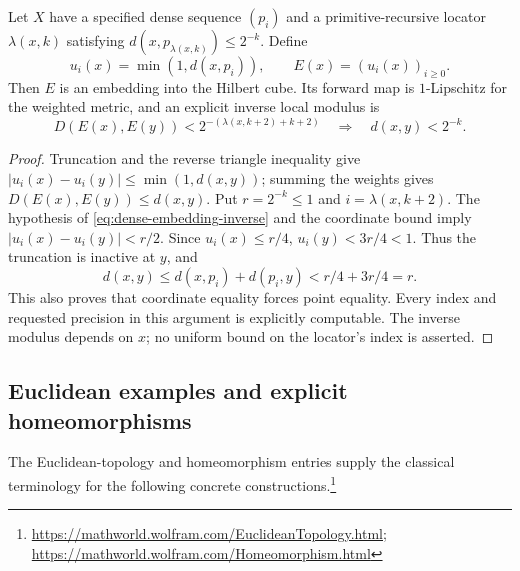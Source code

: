 \begin{theorem}\label{thm:dense-hilbert-embedding}
Let $X$ have a specified dense sequence $(p_i)$ and a primitive-recursive
locator $\lambda(x,k)$ satisfying
$d(x,p_{\lambda(x,k)})\leq2^{-k}$.  Define
\[
 u_i(x)=\min(1,d(x,p_i)),\qquad E(x)=(u_i(x))_{i\geq0}.
\]
Then $E$ is an embedding into the Hilbert cube.  Its forward map is
$1$-Lipschitz for the weighted metric, and an explicit inverse local
modulus is
\begin{equation}\label{eq:dense-embedding-inverse}
 D(E(x),E(y))<2^{-(\lambda(x,k+2)+k+2)}
 \quad\Longrightarrow\quad d(x,y)<2^{-k}.
\end{equation}
\end{theorem}
\begin{proof}
Truncation and the reverse triangle inequality give
$|u_i(x)-u_i(y)|\leq\min(1,d(x,y))$; summing the weights gives
$D(E(x),E(y))\leq d(x,y)$.  Put $r=2^{-k}\leq1$ and
$i=\lambda(x,k+2)$.  The hypothesis of
\eqref{eq:dense-embedding-inverse} and the coordinate bound imply
$|u_i(x)-u_i(y)|<r/2$.  Since $u_i(x)\leq r/4$,
$u_i(y)<3r/4<1$.  Thus the truncation is inactive at $y$, and
\[
 d(x,y)\leq d(x,p_i)+d(p_i,y)<r/4+3r/4=r.
\]
This also proves that coordinate equality forces point equality.  Every
index and requested precision in this argument is explicitly computable.
The inverse modulus depends on $x$; no uniform bound on the locator's
index is asserted.
\end{proof}

\subsection{Euclidean examples and explicit homeomorphisms}

The Euclidean-topology and homeomorphism entries supply the classical
terminology for the following concrete constructions.\footnote{\url{https://mathworld.wolfram.com/EuclideanTopology.html};
\url{https://mathworld.wolfram.com/Homeomorphism.html}}

